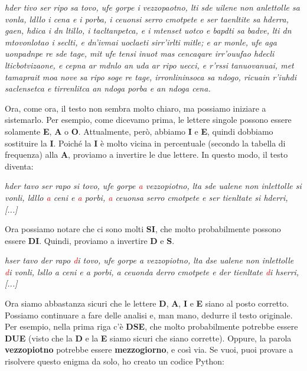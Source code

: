 \documentclass{report}
\begin{document}
\vspace{0.2cm}

\textit{hder tivo ser ripo sa tovo, ufe gorpe i vezzopaotno, lti sde uilene non anlettolle
sa vonla, ldllo i cena e i porba, i ceuonsi serro cmotpete e ser taenltite sa hderra,
gaen, hdica i dn ltillo, i tacltanpetca, e i mtenset uotco e bapdti sa badve, lti dn
mtovonlotao i seclti, e dn’ivmai uoclaeti sirr’irlti mitle; e ar monle, ufe aga uonpadnpe
re sde tage, mit ufe tensi inuot mas cencaqare irr’ouufao hdecli lticbotvizaone, e cepna
ar mdnlo an uda ar ripo uecci, e r’rssi tanuovanuai, met tamaprait moa nove sa ripo soge
re tage, irronlininsoca sa ndogo, ricuain r’iuhdi saclensetca e tirrenlitca an ndoga
porba e an ndoga cena.}
\vspace{0.2cm}

Ora, come ora, il testo non sembra molto chiaro, ma possiamo iniziare a sistemarlo.  
Per esempio, come dicevamo prima, le lettere singole possono essere solamente \textbf{E}, \textbf{A} o \textbf{O}.  
Attualmente, però, abbiamo \textbf{I} e \textbf{E}, quindi dobbiamo sostituire la \textbf{I}.  
Poiché la \textbf{I} è molto vicina in percentuale (secondo la tabella di frequenza) alla \textbf{A}, proviamo a invertire le due lettere.  
In questo modo, il testo diventa:

\vspace{0.2cm}
\textit{hder tavo ser rapo si tovo, ufe gorpe \textcolor{red}{a} vezzopiotno, lta sde ualene non inlettolle
si vonli, ldllo \textcolor{red}{a} ceni e \textcolor{red}{a} porbi, \textcolor{red}{a} ceuonsa serro cmotpete e ser tienltate si hderri, [...]}
\vspace{0.2cm}

Ora possiamo notare che ci sono molti \textbf{SI}, che molto probabilmente possono essere \textbf{DI}.  
Quindi, proviamo a invertire \textbf{D} e \textbf{S}.

\vspace{0.2cm}
\textit{hser tavo der rapo \textcolor{red}{d}i tovo, ufe gorpe a vezzopiotno, lta dse ualene non inlettolle
\textcolor{red}{d}i vonli, lsllo a ceni e a porbi, a ceuonda derro cmotpete e der tienltate \textcolor{red}{d}i hserri, [...]}\vspace{0.2cm}

Ora siamo abbastanza sicuri che le lettere \textbf{D}, \textbf{A}, \textbf{I} e \textbf{E} siano al posto corretto.  
Possiamo continuare a fare delle analisi e, man mano, dedurre il testo originale.  
Per esempio, nella prima riga c'è \textbf{DSE}, che molto probabilmente potrebbe essere \textbf{DUE} (visto che la \textbf{D} e la \textbf{E} siamo sicuri che siano corrette).  
Oppure, la parola \textbf{vezzopiotno} potrebbe essere \textbf{mezzogiorno}, e così via.  
Se vuoi, puoi provare a risolvere questo enigma da solo, ho creato un codice Python: 
\end{document}
